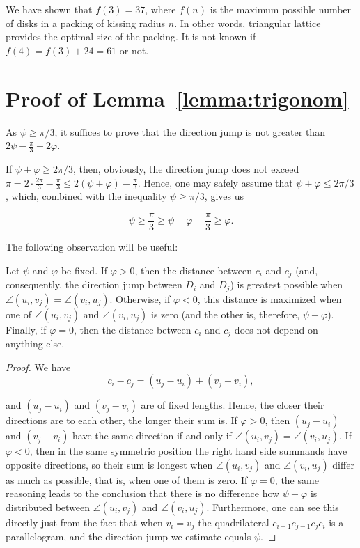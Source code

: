 We have shown that $f(3) = 37$, where $f(n)$ is the maximum possible number of disks in a packing of kissing radius $n$. In other words, triangular lattice provides the optimal size of the packing. It is not known if $f(4) = f(3) + 24 = 61$ or not.

\appendix

\section{Proof of Lemma~\ref{lemma:trigonom}}\label{section:trigonom-proof}

As $\psi\geq\pi/3$, it suffices to prove that the direction jump is not greater than $2\psi - \frac{\pi}{3} + 2\varphi$.

If $\psi + \varphi\geq 2\pi/3$, then, obviously, the direction jump does not exceed $\pi = 2\cdot\frac{2\pi}{3} - \frac{\pi}{3}\leq 2(\psi + \varphi) - \frac{\pi}{3}$. Hence, one may safely assume that $\psi + \varphi\leq 2\pi/3$, which, combined with the inequality $\psi\geq\pi/3$, gives us

\begin{equation}
\label{eq:straighten}
\psi \geq \frac{\pi}{3}\geq \psi + \varphi - \frac{\pi}{3}\geq \varphi.\tag{$\star$}
\end{equation}

The following observation will be useful:

\begin{observation}
Let $\psi$ and $\varphi$ be fixed. If $\varphi > 0$, then the distance between $c_i$ and $c_j$ (and, consequently, the direction jump between $D_i$ and $D_j$) is greatest possible when $\angle(u_i, v_j) = \angle(v_i, u_j)$. Otherwise, if $\varphi < 0$, this distance is maximized when one of $\angle(u_i, v_j)$ and $\angle(v_i, u_j)$ is zero (and the other is, therefore, $\psi + \varphi$). Finally, if $\varphi = 0$, then the distance between $c_i$ and $c_j$ does not depend on anything else.
\end{observation}

\begin{proof}
We have
$$c_i - c_j = (u_j - u_i) + (v_j - v_i),$$

and $(u_j - u_i)$ and $(v_j - v_i)$ are of fixed lengths. Hence, the closer their directions are to each other, the longer their sum is. If $\varphi > 0$, then $(u_j - u_i)$ and $(v_j - v_i)$ have the same direction if and only if $\angle(u_i, v_j) = \angle(v_i, u_j)$. If $\varphi < 0$, then in the same symmetric position the right hand side summands have opposite directions, so their sum is longest when $\angle(u_i, v_j)$ and $\angle(v_i, u_j)$ differ as much as possible, that is, when one of them is zero. If $\varphi = 0$, the same reasoning leads to the conclusion that there is no difference how $\psi + \varphi$ is distributed between $\angle(u_i, v_j)$ and $\angle(v_i, u_j)$. Furthermore, one can see this directly just from the fact that when $v_i = v_j$ the quadrilateral $c_{i+1}c_{j-1}c_jc_i$ is a parallelogram, and the direction jump we estimate equals $\psi$.
\end{proof}

